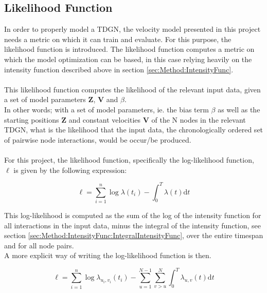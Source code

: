 \subsection{Likelihood Function}
\label{sec:Method:LikelihoodFunc}

In order to properly model a TDGN, the velocity model presented in this project needs a metric on which it can train and evaluate.
For this purpose, the likelihood function is introduced.
The likelihood function computes a metric on which the model optimization can be based, in this case relying heavily on the intensity function described above in section \ref{sec:Method:IntensityFunc}.
\\\\
This likelihood function computes the likelihood of the relevant input data, given a set of model parameters $\textbf{Z}$, $\textbf{V}$ and $\beta$.
\\
In other words; with a set of model parameters, ie. the bias term $\beta$ as well as the starting positions $\textbf{Z}$ and constant velocities $\textbf{V}$ of the N nodes in the relevant TDGN, what is the likelihood that the input data, the chronologically ordered set of pairwise node interactions, would be occur/be produced.
\\\\
For this project, the likelihood function, specifically the log-likelihood function, $\ell$ is given by the following expression:

\begin{equation}
    \ell = \sum_{i=1}^n \log \lambda (t_i) - \int_{0}^T \lambda(t) \mathrm{d} t
    \label{eq:LogLikelihoodFunc}
\end{equation}

This log-likelihood is computed as the sum of the log of the intensity function for all interactions in the input data, minus the integral of the intensity function, see section \ref{sec:Method:IntensityFunc:IntegralIntensityFunc}, over the entire timespan and for all node pairs.
\\
A more explicit way of writing the log-likelihood function is then.

\begin{equation}
    \ell = \sum_{i=1}^n \log \lambda_{u_i,v_i} (t_i) - \sum_{u=1}^{N-1} \sum_{v > u}^{N} \int_{0}^T \lambda_{u,v}(t) \mathrm{d} t
    \label{eq:LogLikelihoodFuncExplicit}
\end{equation}














